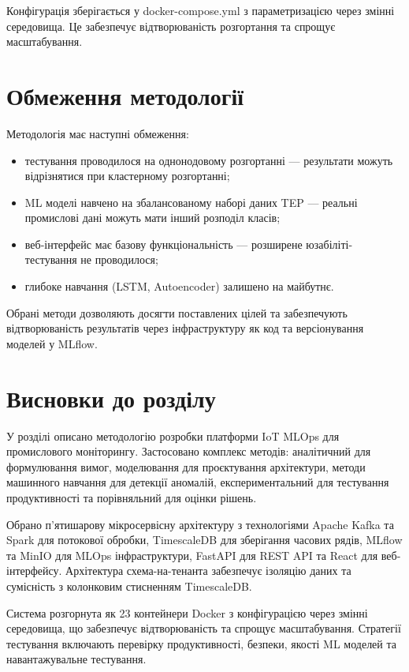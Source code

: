 Конфігурація зберігається у docker-compose.yml з параметризацією через змінні середовища. Це забезпечує відтворюваність розгортання та спрощує масштабування.


\section{Обмеження методології}

Методологія має наступні обмеження:

\begin{itemize}
    \item тестування проводилося на однонодовому розгортанні --- результати можуть відрізнятися при кластерному розгортанні;
    \item ML моделі навчено на збалансованому наборі даних TEP --- реальні промислові дані можуть мати інший розподіл класів;
    \item веб-інтерфейс має базову функціональність --- розширене юзабіліті-тестування не проводилося;
    \item глибоке навчання (LSTM, Autoencoder) залишено на майбутнє.
\end{itemize}

Обрані методи дозволяють досягти поставлених цілей та забезпечують відтворюваність результатів через інфраструктуру як код та версіонування моделей у MLflow.


\section{Висновки до розділу}

У розділі описано методологію розробки платформи IoT MLOps для промислового моніторингу. Застосовано комплекс методів: аналітичний для формулювання вимог, моделювання для проєктування архітектури, методи машинного навчання для детекції аномалій, експериментальний для тестування продуктивності та порівняльний для оцінки рішень.

Обрано п'ятишарову мікросервісну архітектуру з технологіями Apache Kafka та Spark для потокової обробки, TimescaleDB для зберігання часових рядів, MLflow та MinIO для MLOps інфраструктури, FastAPI для REST API та React для веб-інтерфейсу. Архітектура схема-на-тенанта забезпечує ізоляцію даних та сумісність з колонковим стисненням TimescaleDB.

Система розгорнута як 23 контейнери Docker з конфігурацією через змінні середовища, що забезпечує відтворюваність та спрощує масштабування. Стратегії тестування включають перевірку продуктивності, безпеки, якості ML моделей та навантажувальне тестування.

